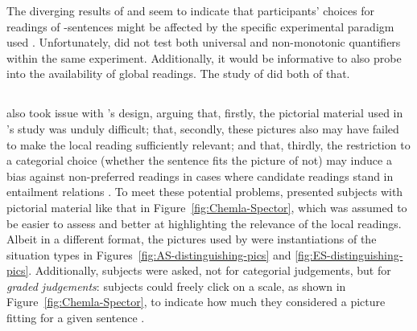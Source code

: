 \documentclass[fleqn,reqno,10pt,draft]{article}
\newcommand{\as}{\acro{as}}
\begin{document}
The diverging results of
\citeauthor{GeurtsPouscoulous2009:Embedded-Implic} and
\citeauthor{CliftonDube2010:Embedded-Implic} seem to indicate that
participants' choices for readings of \as-sentences might be affected
by the specific experimental paradigm used \citep[but see][for
critique of the latter
design]{GeurtsTielvan-Tiel2013:Scalar-expressi}. Unfortunately,
\citet{CliftonDube2010:Embedded-Implic} did not test both universal
and non-monotonic quantifiers within the same
experiment. Additionally, it would be informative to also probe into
the availability of global readings. The study of
\citet{ChemlaSpector2010:Experimental-Ev} did both of that.

\subsection{\citet{ChemlaSpector2010:Experimental-Ev}}
\label{sec:Chemla-Spector}

\citet{ChemlaSpector2010:Experimental-Ev} also took issue with
\citeauthor{GeurtsPouscoulous2009:Embedded-Implic}'s design, arguing
that, firstly, the pictorial material used in
\citeauthor{GeurtsPouscoulous2009:Embedded-Implic}'s study was unduly
difficult; that, secondly, these pictures also may have failed to make
the local reading sufficiently relevant; and that, thirdly, the
restriction to a categorial choice (whether the sentence fits the
picture of not) may induce a bias against non-preferred readings in
cases where candidate readings stand in entailment relations
\citep[c.f.][for this latter
criticism]{Sauerland2010:Embedded-Implic}. To meet these potential
problems, \citet{ChemlaSpector2010:Experimental-Ev} presented subjects
with pictorial material like that in Figure~\ref{fig:Chemla-Spector},
which was assumed to be easier to assess and better at highlighting
the relevance of the local readings. Albeit in a different format, the
pictures used by \citeauthor{ChemlaSpector2010:Experimental-Ev} were
instantiations of the situation types in
Figures~\ref{fig:AS-distinguishing-pics} and
\ref{fig:ES-distinguishing-pics}. Additionally, subjects were asked,
not for categorial judgements, but for \textit{graded judgements}:
subjects could freely click on a scale, as shown in
Figure~\ref{fig:Chemla-Spector}, to indicate how much they considered
a picture fitting for a given sentence \citep[c.f.][for more on this
method]{Chemla2009:Presuppositions}. 
\end{document}
